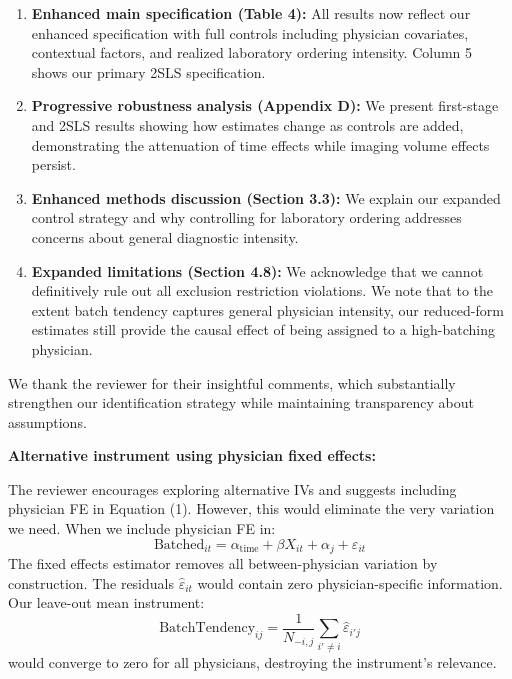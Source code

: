 \documentclass[11pt]{article}
\newcommand{\1}{\hbox{\rm 1\kern-.35em 1}}
\begin{document}
\begin{enumerate}
\item \textbf{Enhanced main specification (Table 4):} All results now reflect our enhanced specification with full controls including physician covariates, contextual factors, and realized laboratory ordering intensity. Column 5 shows our primary 2SLS specification.

\item \textbf{Progressive robustness analysis (Appendix D):} We present first-stage and 2SLS results showing how estimates change as controls are added, demonstrating the attenuation of time effects while imaging volume effects persist.

\item \textbf{Enhanced methods discussion (Section 3.3):} We explain our expanded control strategy and why controlling for laboratory ordering addresses concerns about general diagnostic intensity.

\item \textbf{Expanded limitations (Section 4.8):} We acknowledge that we cannot definitively rule out all exclusion restriction violations. We note that to the extent batch tendency captures general physician intensity, our reduced-form estimates still provide the causal effect of being assigned to a high-batching physician.
\end{enumerate}

We thank the reviewer for their insightful comments, which substantially strengthen our identification strategy while maintaining transparency about assumptions.

\textbf{Alternative instrument using physician fixed effects:}

The reviewer encourages exploring alternative IVs and suggests including physician FE in Equation (1). However, this would eliminate the very variation we need. When we include physician FE in:
\begin{equation}
\text{Batched}_{it} = \alpha_{\text{time}} + \beta X_{it} + \alpha_j + \varepsilon_{it}
\end{equation}
The fixed effects estimator removes all between-physician variation by construction. The residuals $\hat{\varepsilon}_{it}$ would contain zero physician-specific information. Our leave-out mean instrument:
$$\text{BatchTendency}_{ij} = \frac{1}{N_{-i,j}}\sum_{i' \neq i} \hat{\varepsilon}_{i'j}$$
would converge to zero for all physicians, destroying the instrument's relevance.
\end{document}
